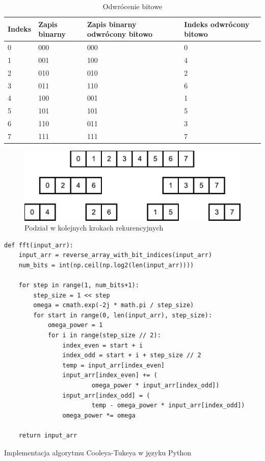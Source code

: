 \documentclass[a4paper,12pt]{book} %
\begin{document}
\begin{table}[H]
\begin{adjustbox}{max width=\textwidth}
\begin{tabular}{|l|l|l|l|}
\hline
Indeks & Zapis binarny & Zapis binarny odwrócony bitowo & Indeks odwrócony bitowo \\
\hline
0 & 000 & 000 & 0 \\
1 & 001 & 100 & 4 \\
2 & 010 & 010 & 2 \\
3 & 011 & 110 & 6 \\
4 & 100 & 001 & 1 \\
5 & 101 & 101 & 5 \\
6 & 110 & 011 & 3 \\
7 & 111 & 111 & 7 \\
\hline
\end{tabular}
\end{adjustbox}
\caption{Odwrócenie bitowe}
\label{tab:bit_reversal}
\end{table}
\begin{figure}[h]
	\centering
	\includegraphics[scale=0.7]{assets/bit_reversal.pdf}
	\caption{Podział w kolejnych krokach rekurencyjnych}
	\label{fig:bit_reversal}
\end{figure}

\begin{lstfloat}[H]
\lstset{language=Python}
\begin{lstlisting}[frame=single]
def fft(input_arr):
    input_arr = reverse_array_with_bit_indices(input_arr)
    num_bits = int(np.ceil(np.log2(len(input_arr))))

    for step in range(1, num_bits+1):
        step_size = 1 << step
        omega = cmath.exp(-2j * math.pi / step_size)
        for start in range(0, len(input_arr), step_size):
            omega_power = 1
            for i in range(step_size // 2):
                index_even = start + i
                index_odd = start + i + step_size // 2
                temp = input_arr[index_even]
                input_arr[index_even] += (
                        omega_power * input_arr[index_odd])
                input_arr[index_odd] = (
                        temp - omega_power * input_arr[index_odd])
                omega_power *= omega

    return input_arr
\end{lstlisting}
\caption{Implementacja algorytmu Cooleya-Tukeya w języku Python}
\label{lst:fft_python}
\end{lstfloat}
\end{document}
